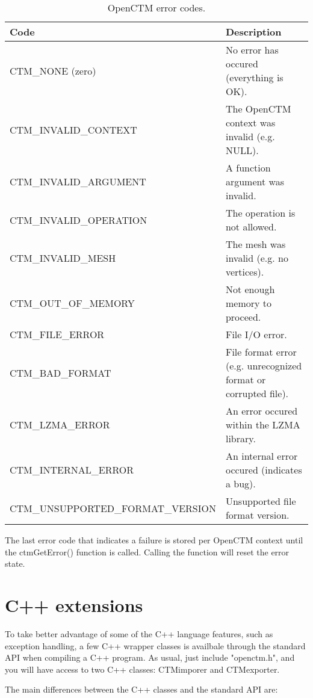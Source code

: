 \begin{table}[p]
\centering
\begin{tabular}{|l|p{7cm}|}\hline
\textbf{Code} & \textbf{Description}\\ \hline
CTM\_NONE (zero) & No error has occured (everything is OK).\\ \hline
CTM\_INVALID\_CONTEXT & The OpenCTM context was invalid (e.g. NULL).\\ \hline
CTM\_INVALID\_ARGUMENT & A function argument was invalid.\\ \hline
CTM\_INVALID\_OPERATION & The operation is not allowed.\\ \hline
CTM\_INVALID\_MESH & The mesh was invalid (e.g. no vertices).\\ \hline
CTM\_OUT\_OF\_MEMORY & Not enough memory to proceed.\\ \hline
CTM\_FILE\_ERROR & File I/O error.\\ \hline
CTM\_BAD\_FORMAT & File format error (e.g. unrecognized format or corrupted file).\\ \hline
CTM\_LZMA\_ERROR & An error occured within the LZMA library.\\ \hline
CTM\_INTERNAL\_ERROR & An internal error occured (indicates a bug).\\ \hline
CTM\_UNSUPPORTED\_FORMAT\_VERSION & Unsupported file format version.\\ \hline
\end{tabular}
\caption{OpenCTM error codes.}
\label{tab:ErrorCodes}
\end{table}

The last error code that indicates a failure is stored per OpenCTM context
until the ctmGetError() function is called. Calling the function will reset
the error state.




\chapter{C++ extensions}
To take better advantage of some of the C++ language features, such as
exception handling, a few C++ wrapper classes is availbale through the standard
API when compiling a C++ program. As usual, just include "openctm.h", and you
will have access to two C++ classes: CTMimporer and CTMexporter.

The main differences between the C++ classes and the standard API are:

